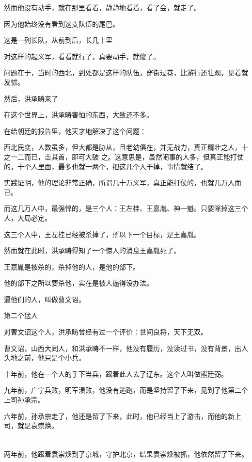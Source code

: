 \documentclass[11pt,a4paper,onecolumn]{article}
\begin{document}
然而他没有动手，就在那里看着，静静地看着，看了会，就走了。

因为他始终没有看到这支队伍的尾巴。

这是一列长队，从前到后，长几十里

对这样的起义军，看看就行了，真要动手，就傻了。

问题在于，当时的西北，到处都是这样的队伍，穿街过巷，比游行还壮观，见着就发怵。

然后，洪承畴来了

在这个世界上，洪承畴害怕的东西，大致还不多。

在给朝廷的报告里，他天才地解决了这个问题：

西北民变，人数虽多，但大都是胁从，且老幼俱在，并无战力，真正精壮之人，十之一二而已，击其首，即可大破
之。这意思是，虽然闹事的人多，但真正能打仗的，十个人里面，最多也就一两个，把这几个人干掉，事情就结了。

实践证明，他的理论非常正确，所谓几十万义军，真正能打仗的，也就几万人而已。

而这几万人中，最强悍的，是三个人：王左桂、王嘉胤、神一魁。只要除掉这三个人，大局必定。

这三个人中，王左桂已经被杀掉了，所以下一个目标，是王嘉胤。

然而就在此时，洪承畴得知了一个惊人的消息\myrule 王嘉胤死了。

王嘉胤是被杀的，杀掉他的人，是他的部下。

他的部下之所以要杀他，实在是被人逼得没办法。

逼他们的人，叫做曹文诏。

第二个猛人

对曹文诏这个人，洪承畴曾经有过一个评价：世间良将，天下无双。

曹文诏，山西大同人，和洪承畴不一样，他没有履历，没读过书，没有背景，出人头地之前，他只是个小兵。

十年前，他在一个人的手下当兵，跟着此人去了辽东。这个人叫做熊廷弼。

九年前，广宁兵败，明军溃败，他没有逃跑，而是坚持留了下来，见到了他第二个上司\myrule 孙承宗。

六年前，孙承宗走了，他还是留了下来，此时，他已经当上了游击，而他的新上司，就是袁崇焕。

\section[\thesection]{}

两年前，他跟着袁崇焕到了京城，守护北京，结果袁崇焕被抓，他依然留了下来。
\end{document}
